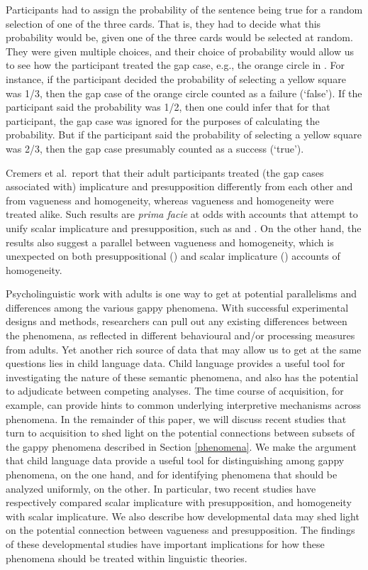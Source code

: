 \documentclass[12pt, letterpaper]{article}
\begin{document}
Participants had to assign the probability of the sentence being true for a random selection of one of the three cards. That is, they had to decide what this probability would be, given one of the three cards would be selected at random. They were given multiple choices, and their choice of probability would allow us to see how the participant treated the gap case, e.g., the orange circle in \Last. For instance, if the participant decided the probability of selecting a yellow square was 1/3, then the gap case of the orange circle counted as a failure (`false'). If the participant said the probability was 1/2, then one could infer that for that participant, the gap case was ignored for the purposes of calculating the probability. But if the participant said the probability of selecting a yellow square was 2/3, then the gap case presumably counted as a success (`true').

Cremers et al.~report that their adult participants treated (the gap cases associated with) implicature and presupposition differently from each other and from vagueness and homogeneity, whereas vagueness and homogeneity were treated alike. Such results are \textit{prima facie} at odds with accounts that attempt to unify scalar implicature and presupposition, such as \cite{Chemla:2009} and \cite{Romoli:2014}. On the other hand, the results also suggest a parallel between vagueness and homogeneity, which is unexpected on both presuppositional (\citealt{Gajewski:2005}) and scalar implicature (\citealt{Magri:2014}) accounts of homogeneity.

Psycholinguistic work with adults is one way to get at potential parallelisms and differences among the various gappy phenomena. With successful experimental designs and methods, researchers can pull out any existing differences between the phenomena, as reflected in different behavioural and/or processing measures from adults. Yet another rich source of data that may allow us to get at the same questions lies in child language data. Child language provides a useful tool for investigating the nature of these semantic phenomena, and also has the potential to adjudicate between competing analyses. The time course of acquisition, for example, can provide hints to common underlying interpretive mechanisms across phenomena. In the remainder of this paper, we will discuss recent studies that turn to acquisition to shed light on the potential connections between subsets of the gappy phenomena described in Section \ref{phenomena}. We make the argument that child language data provide a useful tool for distinguishing among gappy phenomena, on the one hand, and for identifying phenomena that should be analyzed uniformly, on the other. In particular, two recent studies have respectively compared scalar implicature with presupposition, and homogeneity with scalar implicature. We also describe how developmental data may shed light on the potential connection between vagueness and presupposition. The findings of these developmental studies have important implications for how these phenomena should be treated within linguistic theories. 
\end{document}
